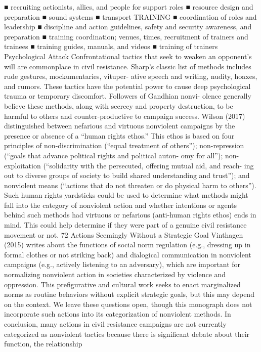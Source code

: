 \documentclass[twoside,a4paper,12pt,fleqn,openany]{extbook}
\begin{document}
■
 recruiting actionists, allies, and people for support roles
■
 resource design and preparation
■
 sound systems
■
 transport
TRAINING
■
 coordination of roles and leadership
■
 discipline and action guidelines, safety and security awareness, and preparation
■
 training coordination; venues, times, recruitment of trainers and trainees
■
 training guides, manuals, and videos
■
 training of trainers
Psychological Attack
Confrontational tactics that seek to weaken an opponent’s will are commonplace in civil
resistance. Sharp’s classic list of methods includes rude gestures, mockumentaries, vituper-
ative speech and writing, nudity, hoaxes, and rumors. These tactics have the potential power
to cause deep psychological trauma or temporary discomfort. Followers of Gandhian nonvi-
olence generally believe these methods, along with secrecy and property destruction, to be
harmful to others and counter-productive to campaign success. Wilson (2017) distinguished
between nefarious and virtuous nonviolent campaigns by the presence or absence of a
“human rights ethos.” This ethos is based on four principles of non-discrimination (“equal
treatment of others”); non-repression (“goals that advance political rights and political auton-
omy for all”); non-exploitation (“solidarity with the persecuted, offering mutual aid, and reach-
ing out to diverse groups of society to build shared understanding and trust”); and nonviolent
means (“actions that do not threaten or do physical harm to others”).
Such human rights yardsticks could be used to determine what methods might fall into
the category of nonviolent action and whether intentions or agents behind such methods
had virtuous or nefarious (anti-human rights ethos) ends in mind. This could help determine
if they were part of a genuine civil resistance movement or not.
72
Actions Seemingly Without a Strategic Goal
Vinthagen (2015) writes about the functions of social norm regulation (e.g., dressing up in
formal clothes or not striking back) and dialogical communication in nonviolent campaigns
(e.g., actively listening to an adversary), which are important for normalizing nonviolent action
in societies characterized by violence and oppression. This prefigurative and cultural work
seeks to enact marginalized norms as routine behaviors without explicit strategic goals, but
this may depend on the context. We leave these questions open, though this monograph
does not incorporate such actions into its categorization of nonviolent methods.
In conclusion, many actions in civil resistance campaigns are not currently categorized
as nonviolent tactics because there is significant debate about their function, the relationship
\end{document}
